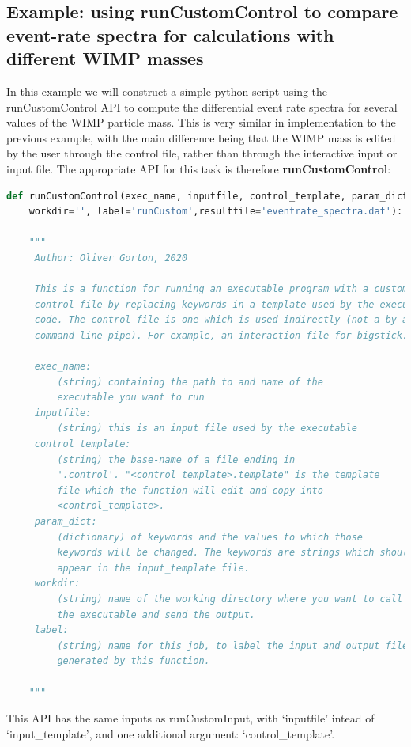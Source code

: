 \documentclass[11pt]{article}
\begin{document}
\subsection{Example: using runCustomControl to compare event-rate spectra for
calculations with different WIMP masses}

In this example we will construct a simple python script using the 
runCustomControl API to compute the differential event rate spectra for several
values of the WIMP particle mass. This is very similar in implementation to the
previous example, with the main difference being that the WIMP mass is edited by
the user through the control file, rather than through the interactive input or
input file. The appropriate API for this task is therefore \textbf{
runCustomControl}:
\begin{lstlisting}[language=python]
def runCustomControl(exec_name, inputfile, control_template, param_dict,
    workdir='', label='runCustom',resultfile='eventrate_spectra.dat'):

    """
     Author: Oliver Gorton, 2020

     This is a function for running an executable program with a custom
     control file by replacing keywords in a template used by the executed
     code. The control file is one which is used indirectly (not a by a 
     command line pipe). For example, an interaction file for bigstick.

     exec_name: 
         (string) containing the path to and name of the
         executable you want to run
     inputfile: 
         (string) this is an input file used by the executable
     control_template: 
         (string) the base-name of a file ending in 
         '.control'. "<control_template>.template" is the template 
         file which the function will edit and copy into 
         <control_template>.
     param_dict: 
         (dictionary) of keywords and the values to which those 
         keywords will be changed. The keywords are strings which should 
         appear in the input_template file. 
     workdir: 
         (string) name of the working directory where you want to call
         the executable and send the output.
     label: 
         (string) name for this job, to label the input and output files 
         generated by this function.

    """
\end{lstlisting}
This API has the same inputs as runCustomInput, with `inputfile' intead of
`input\_template', and one additional argument: `control\_template'.
\end{document}
